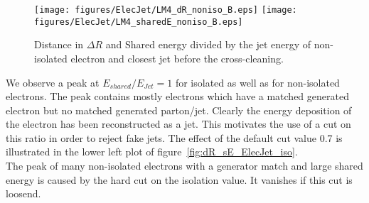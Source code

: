 \documentclass{cmspaper}
\begin{document}
\begin{figure}[hb]
\begin{center}
    \texttt{[image: figures/ElecJet/LM4\_dR\_noniso\_B.eps]}
    \texttt{[image: figures/ElecJet/LM4\_sharedE\_noniso\_B.eps]}
    \caption{Distance in $\Delta R$ and Shared energy divided by the jet energy of non-isolated electron and closest jet
before the cross-cleaning.}
\label{fig:dR_sE_ElecJet_noniso}
\end{center}
\end{figure}

We observe a peak at $E_{shared}/E_{Jet}=1$ for isolated as well as for
non-isolated electrons. The peak contains mostly electrons which have a matched
generated electron but no matched generated parton/jet. Clearly the energy
deposition of the electron has been reconstructed as a jet. This motivates the
use of a cut on this ratio in order to reject fake jets. The effect of the
default cut value 0.7 is illustrated in the lower left plot of
figure~\ref{fig:dR_sE_ElecJet_iso}.\\


The peak of many non-isolated electrons with a generator match and large shared energy is caused by the hard cut on the isolation value. It vanishes if this cut is loosend.

\end{document}

